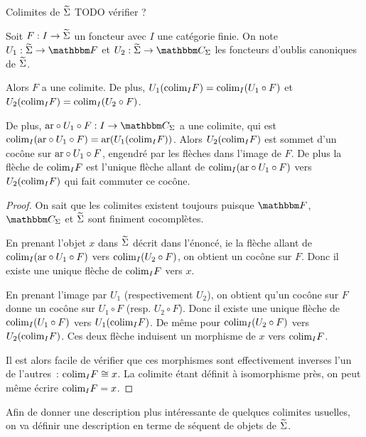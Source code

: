 \begin{theo}{Colimites de $\widetilde{\Sigma}$}
    TODO vérifier ?

    Soit $F : I\rightarrow\widetilde{\Sigma}$ un foncteur avec $I$ une catégorie finie. On note
    $U_1 : \tsigma\rightarrow\cf$ et $U_2 : \tsigma\rightarrow\C_\Sigma$ les foncteurs
    d'oublis canoniques de $\widetilde{\Sigma}$.

    Alors $F$ a une colimite. De plus, $U_1(\text{colim}_I F) = \text{colim}_I (U_1\circ F)$ et
    $U_2(\text{colim}_I F) = \text{colim}_I (U_2\circ F)$.

    De plus, $\arf\circ U_1\circ F : I\rightarrow\C_\Sigma$ a une colimite, qui
    est $\text{colim}_I (\text{ar}\circ U_1\circ F) = \text{ar}(U_1(\text{colim}_I F))$. Alors
    $U_2(\text{colim}_I F)$ est sommet d'un cocône sur $\text{ar}\circ U_1\circ F$, engendré
    par les flèches dans l'image de $F$. De plus la flèche de $\text{colim}_I F$ est
    l'unique flèche allant de $\text{colim}_I (\text{ar}\circ U_1\circ F)$ vers $U_2(\text{colim}_I F)$
    qui fait commuter ce cocône.
\end{theo}

\begin{proof}
    On sait que les colimites existent toujours puisque $\cf$, $\C_\Sigma$ et $\widetilde{\Sigma}$
    sont finiment cocomplètes.

    En prenant
    l'objet $x$ dans $\widetilde{\Sigma}$ décrit dans l'énoncé, ie la flèche allant de
    $\text{colim}_I (\text{ar}\circ U_1\circ F)$ vers $\text{colim}_I (U_2\circ F)$, on obtient
    un cocône sur $F$. Donc il existe une unique flèche de $\text{colim}_I F$ vers $x$.

    En prenant l'image par $U_1$ (respectivement $U_2$), on obtient qu'un cocône sur
    $F$ donne un cocône sur $U_1\circ F$ (resp. $U_2\circ F$). Donc il existe une
    unique flèche de $\text{colim}_I (U_1\circ F)$ vers $U_1(\text{colim}_I F)$. De même pour
    $\text{colim}_I (U_2\circ F)$ vers $U_2(\text{colim}_I F)$. Ces deux flèche induisent un
    morphisme de $x$ vers $\text{colim}_I F$.

    Il est alors facile de vérifier que ces morphismes sont effectivement inverses
    l'un de l'autres~: $\text{colim}_I F\cong x$. La colimite étant définit à isomorphisme
    près, on peut même écrire $\text{colim}_I F = x$.
\end{proof}

Afin de donner une description plus intéressante de quelques colimites usuelles, on
va définir une description en terme de séquent de objets de $\widetilde{\Sigma}$.

